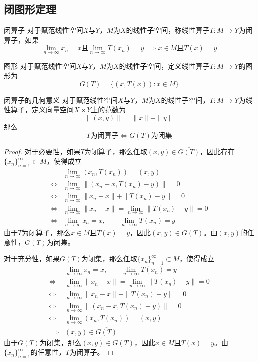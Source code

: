 \documentclass[lang = cn, scheme = chinese, thmcnt = section]{elegantbook}
\newcommand{\sub}{\subset}             %
\begin{document}
\subsection{闭图形定理}

\begin{definition}{闭算子}
	对于赋范线性空间$X$与$Y$，$M$为$X$的线性子空间，称线性算子$T:M\to Y$为闭算子，如果
	$$
	\lim_{n\to\infty}x_n=x\text{且}
	\lim_{n\to\infty}T(x_n)=y
	\implies x\in M\text{且}T(x)=y
	$$
\end{definition}

\begin{definition}{图形}
	对于赋范线性空间$X$与$Y$，$M$为$X$的线性子空间，定义线性算子$T:M\to Y$的图形为
	$$
	G(T)=\{ (x,T(x)):x\in M \}
	$$
\end{definition}

\begin{theorem}{闭算子的几何意义}
	对于赋范线性空间$X$与$Y$，$M$为$X$的线性子空间，$T:M\to Y$为线性算子，定义向量空间$X\times Y$上的范数为
	$$
	\|(x,y)\|=\|x\|+\|y\|
	$$
	那么
	$$
	T\text{为闭算子}\iff G(T)\text{为闭集}
	$$
\end{theorem}

\begin{proof}
	对于必要性，如果$T$为闭算子，那么任取$(x,y)\in \overline{G(T)}$，因此存在$\{x_n\}_{n=1}^{\infty}\sub M$，使得成立
	\begin{align*}
		& \lim_{n\to\infty}(x_n,T(x_n))=(x,y)\\
		\iff & \lim_{n\to\infty}\|(x_n-x,T(x_n)-y)\|=0\\
		\iff & \lim_{n\to\infty}\|x_n-x\|+\|T(x_n)-y\|=0\\
		\iff &  \lim_{n\to\infty}\|x_n-x\|=\lim_{n\to\infty}\|T(x_n)-y\|=0\\
		\iff & \lim_{n\to\infty}x_n=x,\qquad 
		\lim_{n\to\infty}T(x_n)=y
	\end{align*}
	由于$T$为闭算子，那么$x\in M$且$T(x)=y$，因此$(x,y)\in G(T)$。由$(x,y)$的任意性，$G(T)$为闭集。
	
	对于充分性，如果$G(T)$为闭集，那么任取$\{x_n\}_{n=1}^{\infty}\sub M$，使得成立
	\begin{align*}
		& \lim_{n\to\infty}x_n=x,\qquad 
		\lim_{n\to\infty}T(x_n)=y\\
		\iff &  \lim_{n\to\infty}\|x_n-x\|=\lim_{n\to\infty}\|T(x_n)-y\|=0\\
		\iff & \lim_{n\to\infty}\|x_n-x\|+\|T(x_n)-y\|=0\\
		\iff & \lim_{n\to\infty}\|(x_n-x,T(x_n)-y)\|=0\\
		\iff & \lim_{n\to\infty}(x_n,T(x_n))=(x,y)\\
		\implies& (x,y)\in \overline{G(T)}
	\end{align*}
	由于$G(T)$为闭集，那么$(x,y)\in G(T)$，因此$x\in M$且$T(x)=y$。由$\{x_n\}_{n=1}^{\infty}$的任意性，$T$为闭算子。
\end{proof}
\end{document}
